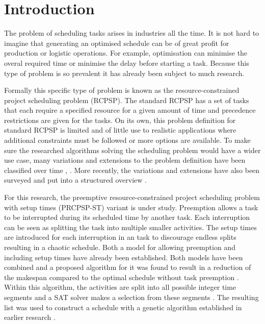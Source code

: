 \section{Introduction}
The problem of scheduling tasks arises in industries all the time. It is not hard to imagine that generating an optimised schedule can be of great profit for production or logistic operations. For example, optimisation can minimise the overal required time or minimise the delay before starting a task. Because this type of problem is so prevalent it has already been subject to much research.

Formally this specific type of problem is known as the resource-constrained project scheduling problem (RCPSP). The standard RCPSP has a set of tasks that each require a specified resource for a given amount of time and precedence restrictions are given for the tasks. On its own, this problem definition for standard RCPSP is limited and of little use to realistic applications where additional constraints must be followed or more options are available.
To make sure the researched algorithms solving the scheduling problem would have a wider use case, many variations and extensions to the problem definition have been classified over time \cite{RN9}, \cite{RN10}. More recently, the variations and extensions have also been surveyed and put into a structured overview \cite{RN6}.


For this research, the preemptive resource-constrained project scheduling problem with setup times (PRCPSP-ST) variant is under study. Preemption allows a task to be interrupted during its scheduled time by another task. Each interruption can be seen as splitting the task into multiple smaller activities. The setup times are introduced for each interruption in an task to discourage endless splits resulting in a chaotic schedule. Both a model for allowing preemption \cite{RN21} and including setup times \cite{RN13} have already been established. Both models have been combined and a proposed algorithm for it was found to result in a reduction of the makespan compared to the optimal schedule without task preemption \cite{RN1}. Within this algorithm, the activities are split into all possible integer time segments and a SAT solver makes a selection from these segments \cite{RN3}. The resulting list was used to construct a schedule with a genetic algorithm established in earlier research \cite{RN14}.

